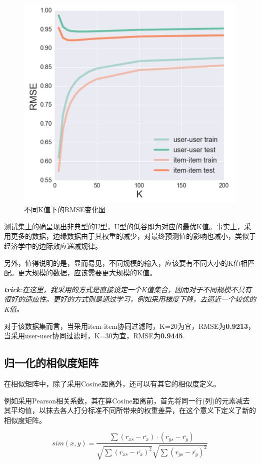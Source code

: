\documentclass[utf8, a4paper, 11pt, onecolumn]{ctexart}
\begin{document}
\begin{spacing}{1.3}
\begin{figure}
	\centering
	\includegraphics[width=0.8\linewidth]{k-figure.png}
	\caption{不同K值下的RMSE变化图}
	\label{k-figure}
\end{figure}

测试集上的确呈现出非典型的U型，U型的低谷即为对应的最优K值。事实上，采用更多的数据，边缘数据由于其权重的减少，对最终预测值的影响也减小，类似于经济学中的边际效应递减规律。

另外，值得说明的是，显而易见，不同规模的输入，应该要有不同大小的K值相匹配。更大规模的数据，应该需要更大规模的K值。

\textit{\textbf{trick}:在这里，我采用的方式是直接设定一个K值集合，因而对于不同规模不具有很好的适应性。更好的方式则是通过学习，例如采用梯度下降，去逼近一个较优的K值。}

对于该数据集而言，当采用item-item协同过滤时，K=20为宜，RMSE为\textbf{0.9213}，当采用user-user协同过滤时，K=30为宜，RMSE为\textbf{0.9445}.

\subsection{归一化的相似度矩阵}

在相似矩阵中，除了采用Cosine距离外，还可以有其它的相似度定义。

例如采用Pearson相关系数，其在算Cosine距离前，首先将同一行(列)的元素减去其平均值，以抹去各人打分标准不同所带来的权重差异，在这个意义下定义了新的相似度矩阵。

\[sim(x,y) = \frac{\sum (r_{xs}-\overline{r_{x}}) \cdot (r_{ys}-\overline{r_{y}})} {\sqrt{\sum (r_{xs}-\overline{r_{x}})^2} \sqrt{\sum (r_{ys}-\overline{r_{y}})^2}}\]


\end{spacing}
\end{document}
